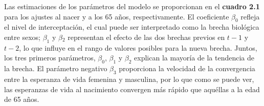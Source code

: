 
Las estimaciones de los parámetros del modelo se proporcionan en el \textbf{cuadro 2.1} para los ajustes al nacer y a los 65 años, respectivamente. El coeficiente $\beta_{0}$ refleja el nivel de interceptación, el cual puede ser interpretado como la brecha biológica entre sexos; $\beta_{1}$ y $\beta{_2}$ representan el efecto de las dos brechas previos en $t-1$ y $t-2$, lo que influye en el rango de valores posibles para la nueva brecha. Juntos, los tres primeros parámetros, $\beta_{0}$, $\beta_{1}$ y $\beta_{2}$ explican la mayoría de la tendencia de la brecha. El parámetro negativo $\beta_{3}$ proporciona la velocidad de la convergencia entre la esperanza de vida femenina y masculina, por lo que como se puede ver, las esperanzas de vida al nacimiento convergen más rápido que aquéllas a la edad de 65 años.

